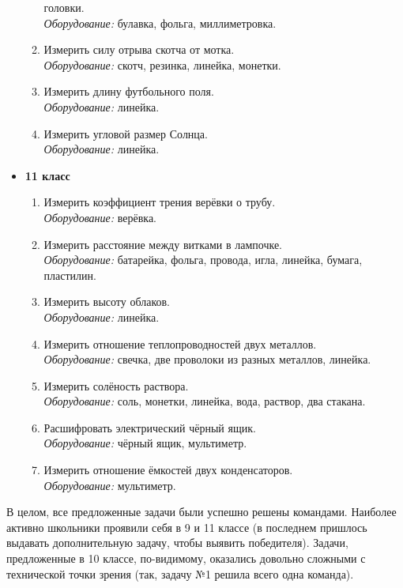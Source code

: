 \documentclass[12pt,a4paper,oneside]{scrartcl}
\newlength{\h}
\newlength{\x}
\begin{document}
\begin{itemize}
\begin{enumerate}
    головки. \\
    \textit{Оборудование:} булавка, фольга, миллиметровка.
  \item Измерить силу отрыва скотча от мотка. \\
    \textit{Оборудование:} скотч, резинка, линейка, монетки.
  \item Измерить длину футбольного поля. \\
    \textit{Оборудование:} линейка.
  \item Измерить угловой размер Солнца. \\
    \textit{Оборудование:} линейка. 
  \end{enumerate}
\item \textbf{11 класс}
  \begin{enumerate}
  \item Измерить коэффициент трения верёвки о трубу. \\
    \textit{Оборудование:} верёвка.
  \item Измерить расстояние между витками в лампочке.\\
    \textit{Оборудование:} батарейка, фольга, провода, игла, линейка,
    бумага, пластилин.
  \item Измерить высоту облаков. \\
    \textit{Оборудование:} линейка.
  \item Измерить отношение теплопроводностей двух металлов. \\
    \textit{Оборудование:} свечка, две проволоки из разных металлов,
    линейка.
  \item Измерить солёность раствора. \\
    \textit{Оборудование:} соль, монетки, линейка, вода, раствор, два
    стакана.
  \item Расшифровать электрический чёрный ящик. \\
    \textit{Оборудование:} чёрный ящик, мультиметр.
  \item Измерить отношение ёмкостей двух конденсаторов. \\
    \textit{Оборудование:} мультиметр. 
  \end{enumerate}
\end{itemize}

В целом, все предложенные задачи были успешно решены
командами. Наиболее активно школьники проявили себя в 9 и 11 классе (в
последнем пришлось выдавать дополнительную задачу, чтобы выявить
победителя). Задачи, предложенные в 10 классе, по-видимому, оказались
довольно сложными с технической точки зрения (так, задачу №1 решила
всего одна команда).
\end{document}
